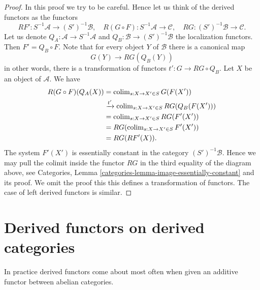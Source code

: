 \begin{proof}
In this proof we try to be careful. Hence let us think of
the derived functors as the functors
$$
RF' : S^{-1}\mathcal{A} \to (S')^{-1}\mathcal{B},\quad
R(G \circ F) : S^{-1}\mathcal{A} \to \mathcal{C},\quad
RG : (S')^{-1}\mathcal{B} \to \mathcal{C}.
$$
Let us denote
$Q_A : \mathcal{A} \to S^{-1}\mathcal{A}$ and
$Q_B : \mathcal{B} \to (S')^{-1}\mathcal{B}$
the localization functors. Then $F' = Q_B \circ F$. Note that for
every object $Y$ of $\mathcal{B}$ there is a canonical map
$$
G(Y) \longrightarrow RG(Q_B(Y))
$$
in other words, there is a transformation of functors
$t' : G \to RG \circ Q_B$. Let $X$ be an object of $\mathcal{A}$.
We have
\begin{align*}
R(G \circ F)(Q_A(X))
& = \mathop{\rm colim}\nolimits_{s : X \to X' \in S} G(F(X')) \\
& \xrightarrow{t'} \mathop{\rm colim}\nolimits_{s : X \to X' \in S} RG(Q_B(F(X'))) \\
& = \mathop{\rm colim}\nolimits_{s : X \to X' \in S} RG(F'(X')) \\
& = RG(\mathop{\rm colim}\nolimits_{s : X \to X' \in S} F'(X')) \\
& = RG(RF'(X)).
\end{align*}
The system $F'(X')$ is essentially constant in the category
$(S')^{-1}\mathcal{B}$. Hence we may pull the colimit inside the
functor $RG$ in the third equality of the diagram above, see
Categories, Lemma \ref{categories-lemma-image-essentially-constant}
and its proof. We omit the proof this this defines a transformation
of functors. The case of left derived functors is similar.
\end{proof}




\section{Derived functors on derived categories}
\label{section-derived-functors-classical}

\noindent
In practice derived functors come about most often when given an
additive functor between abelian categories.

